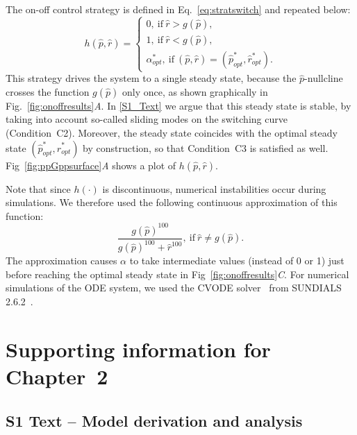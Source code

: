 The on-off control strategy is defined in Eq.~\ref{eq:stratswitch} and repeated below:
\begin{equation}
h(\hat{p}, \hat{r}) = 
\begin{cases}
0, \ \textrm{if} \ \hat{r} > g(\hat{p}),\\
1, \ \textrm{if} \ \hat{r} < g(\hat{p}), \\
\alpha_{opt}^*, \ \textrm{if} \ (\hat{p},\hat{r})=(\hat{p}_{opt}^*,\hat{r}_{opt}^*).
\end{cases}
\end{equation}
This strategy drives the system to a single steady state, because the $\hat{p}$-nullcline crosses the function $g(\hat{p})$ only once, as shown graphically in \linebreak Fig.~\ref{fig:onoffresults}\textit{A}.
In \ref{S1_Text} we argue that this steady state is stable, by taking into account so-called sliding modes on the switching curve~\cite{filippov_differential_1988} (Condition~C2).
Moreover, the steady state coincides with the optimal steady state $(\hat{p}_{opt}^*,\hat{r}_{opt}^*)$ by construction, so that Condition~C3 is satisfied as well.
Fig~\ref{fig:ppGppsurface}\textit{A} shows a plot of $h(\hat{p}, \hat{r})$.

Note that since $h(\cdot)$ is discontinuous, numerical instabilities occur during simulations.
We therefore used the following continuous approximation of this function:
\begin{equation}
\frac{g(\hat{p})^{100}}{g(\hat{p})^{100} + \hat{r}^{100}}, \ \textrm{if} \ \hat{r} \neq g(\hat{p}).
\end{equation}
The approximation causes $\alpha$ to take intermediate values (instead of 0 or 1) just before reaching the optimal steady state in Fig~\ref{fig:onoffresults}\textit{C}.
For numerical simulations of the ODE system, we used the CVODE solver~\cite{cohen_cvode_1996} from SUNDIALS 2.6.2~\cite{hindmarsh_sundials_2005}.

\clearpage

\section{Supporting information for Chapter~2}

\subsection{S1 Text -- Model derivation and analysis}

